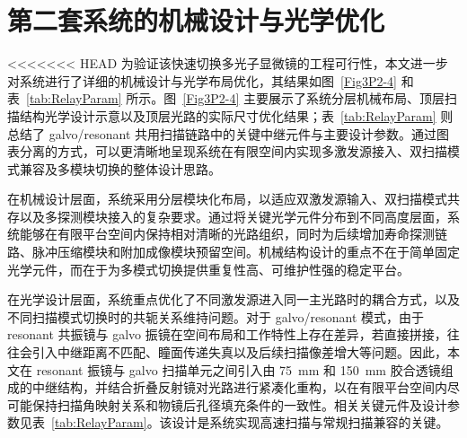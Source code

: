 \section{第二套系统的机械设计与光学优化}\label{4.4}

<<<<<<< HEAD
为验证该快速切换多光子显微镜的工程可行性，本文进一步对系统进行了详细的机械设计与光学布局优化，其结果如图~\ref{Fig3P2-4} 和表~\ref{tab:RelayParam} 所示。图~\ref{Fig3P2-4} 主要展示了系统分层机械布局、顶层扫描结构光学设计示意以及顶层光路的实际尺寸优化结果；表~\ref{tab:RelayParam} 则总结了 galvo/resonant 共用扫描链路中的关键中继元件与主要设计参数。通过图表分离的方式，可以更清晰地呈现系统在有限空间内实现多激发源接入、双扫描模式兼容及多模块切换的整体设计思路。

在机械设计层面，系统采用分层模块化布局，以适应双激发源输入、双扫描模式共存以及多探测模块接入的复杂要求。通过将关键光学元件分布到不同高度层面，系统能够在有限平台空间内保持相对清晰的光路组织，同时为后续增加寿命探测链路、脉冲压缩模块和附加成像模块预留空间。机械结构设计的重点不在于简单固定光学元件，而在于为多模式切换提供重复性高、可维护性强的稳定平台。

在光学设计层面，系统重点优化了不同激发源进入同一主光路时的耦合方式，以及不同扫描模式切换时的共轭关系维持问题。对于 galvo/resonant 模式，由于 resonant 共振镜与 galvo 振镜在空间布局和工作特性上存在差异，若直接拼接，往往会引入中继距离不匹配、瞳面传递失真以及后续扫描像差增大等问题。因此，本文在 resonant 振镜与 galvo 扫描单元之间引入由 75~mm 和 150~mm 胶合透镜组成的中继结构，并结合折叠反射镜对光路进行紧凑化重构，以在有限平台空间内尽可能保持扫描角映射关系和物镜后孔径填充条件的一致性。相关关键元件及设计参数见表~\ref{tab:RelayParam}。该设计是系统实现高速扫描与常规扫描兼容的关键。


